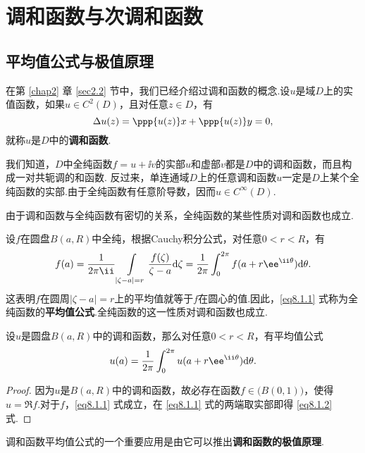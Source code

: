 \setcounter{chapter}{7}
\chapter{调和函数与次调和函数\label{chap8}}
\section{平均值公式与极值原理\label{sec8.1}}
在第 \ref{chap2} 章 \ref{sec2.2} 节中，我们已经介绍过调和函数的概念.设$u$是域$D$上的实值函数，如果$u\in C^2(D)$，且对任意$z\in D$，有
\[\Delta u(z)=\ppp{u(z)}x+\ppp{u(z)}y=0,\]
就称$u$是$D$中的\textbf{调和函数}.

我们知道，$D$中全纯函数$f=u+\ii v$的实部$u$和虚部$v$都是$D$中的调和函数，而且构成一对共轭调的和函数. 反过来，单连通域$D$上的任意调和函数$u$一定是$D$上某个全纯函数的实部.由于全纯函数有任意阶导数，因而$u\in C^\infty(D)$.

由于调和函数与全纯函数有密切的关系，全纯函数的某些性质对调和函数也成立.

设$f$在圆盘$B(a,R)$中全纯，根据Cauchy积分公式，对任意$0<r<R$，有
\begin{equation}\label{eq8.1.1}
f(a)=\frac1{2\pi\ii}\int\limits_{|\zeta-a|=r}\frac{f(\zeta)}{\zeta-a}\textrm d\zeta
=\frac1{2\pi}\int_0^{2\pi}f(a+r\ee^{\ii\theta})\textrm d\theta.
\end{equation}
这表明$f$在圆周$|\zeta-a|=r$上的平均值就等于$f$在圆心的值.因此，\eqref{eq8.1.1} 式称为全纯函数的\textbf{平均值公式}.全纯函数的这一性质对调和函数也成立.

\begin{theorem}\label{thm8.1.1}
设$u$是圆盘$B(a,R)$中的调和函数，那么对任意$0<r<R$，有平均值公式
\begin{equation}\label{eq8.1.2}
u(a)=\frac1{2\pi}\int_0^{2\pi}u(a+r\ee^{\ii\theta})\textrm d\theta.
\end{equation}
\end{theorem}
\begin{proof}
因为$u$是$B(a,R)$中的调和函数，故必存在函数$f\in\big(B(0,1)\big)$，使得$u=\Re f$.对于$f$，\eqref{eq8.1.1} 式成立，在 \eqref{eq8.1.1} 式的两端取实部即得 \eqref{eq8.1.2} 式.
\end{proof}

调和函数平均值公式的一个重要应用是由它可以推出\textbf{调和函数的极值原理}.

